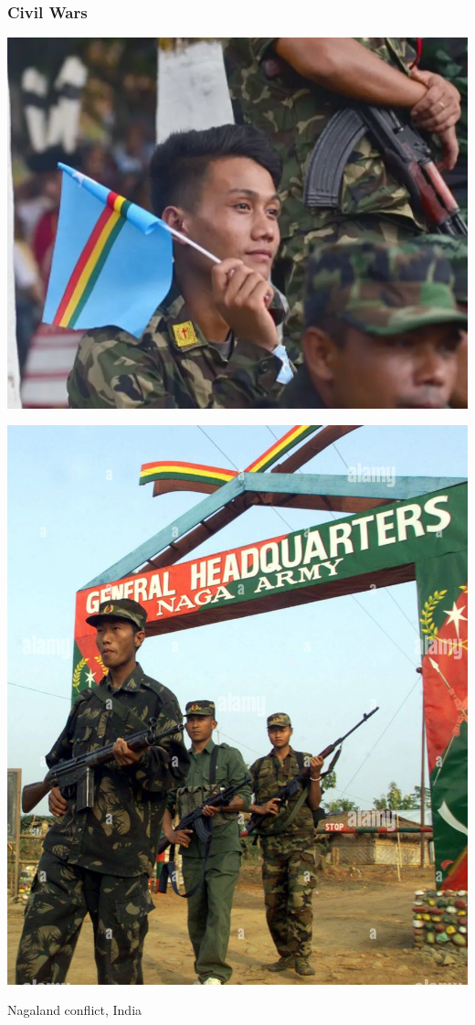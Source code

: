 \documentclass[utf8, xcolor=dvipsnames]{beamer}
\begin{document}
\begin{frame}
\frametitle{Civil Wars}
\centering

\begin{minipage}{0.49\textwidth}\centering
\includegraphics[width = \textwidth]{img/naga1}
\end{minipage}\hfill
\begin{minipage}{0.49\textwidth}\centering
\includegraphics[width = \textwidth]{img/naga2}
\end{minipage}

Nagaland conflict, India

\end{frame}
\end{document}

